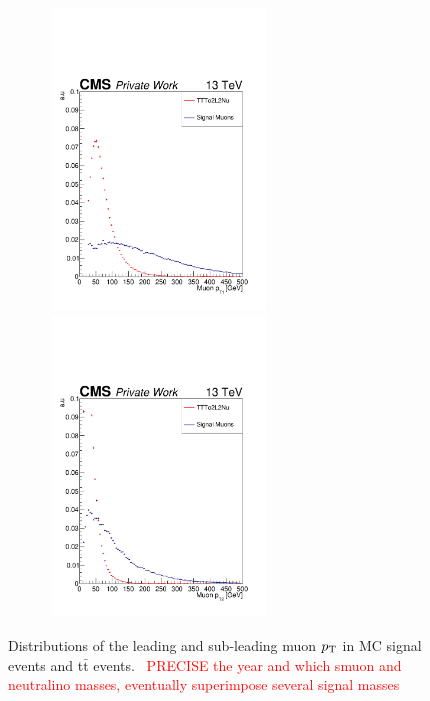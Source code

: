 \documentclass{cernatlasnote}
\newcommand{\ttbar}{t$\bar{\text{t}}$\xspace}
\newcommand{\pt}{$p_{\text T}$\xspace}
\begin{document}
\begin{appendices}
\begin{figure}[ht]
\centering
\includegraphics[height=8cm, width=8cm, trim= 0cm 0cm 0cm 0.cm,clip]{images/Muon/MuonLeadingPt.pdf}\includegraphics[height=8cm, width=8cm, trim= 0cm 0cm 0cm 0.cm,clip]{images/Muon/MuonLeadingPt2.pdf}
\caption{\label{fig:MuonPt} Distributions of the leading and sub-leading muon \pt in MC signal events and \ttbar events.
~\textcolor{red}{PRECISE the year and which smuon and neutralino masses, eventually superimpose several signal masses}
}
\end{figure}
\FloatBarrier


\end{appendices}
\end{document}
